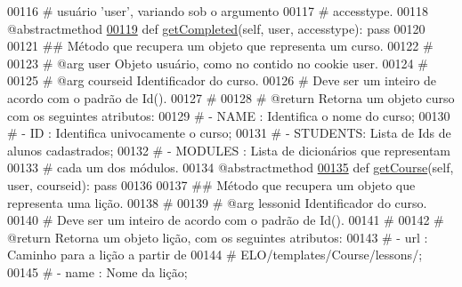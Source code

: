 \begin{DoxyCode}
00116     \textcolor{comment}{#                       usuário 'user', variando sob o argumento}
00117     \textcolor{comment}{#                       accesstype.}
00118     @abstractmethod
\hypertarget{CourseUnit_8py_source_l00119}{}\hyperlink{classCourse_1_1CourseUnit_1_1IfBusCourse_af764ac539a72d830490a80e4d70f567a}{00119}     \textcolor{keyword}{def }\hyperlink{classCourse_1_1CourseUnit_1_1IfBusCourse_af764ac539a72d830490a80e4d70f567a}{getCompleted}(self, user, accesstype): \textcolor{keyword}{pass}
00120 
00121     \textcolor{comment}{## Método que recupera um objeto que representa um curso.}
00122     \textcolor{comment}{#}
00123     \textcolor{comment}{#   @arg user       Objeto usuário, como no contido no cookie user.}
00124     \textcolor{comment}{#}
00125     \textcolor{comment}{#   @arg courseid   Identificador do curso.}
00126     \textcolor{comment}{#                       Deve ser um inteiro de acordo com o padrão de Id().}
00127     \textcolor{comment}{#}
00128     \textcolor{comment}{#   @return         Retorna um objeto curso com os seguintes atributos:}
00129     \textcolor{comment}{#                       - NAME    : Identifica o nome do curso;}
00130     \textcolor{comment}{#                       - ID      : Identifica univocamente o curso;}
00131     \textcolor{comment}{#                       - STUDENTS: Lista de Ids de alunos cadastrados;}
00132     \textcolor{comment}{#                       - MODULES : Lista de dicionários que representam}
00133     \textcolor{comment}{#                                       cada um dos módulos.}
00134     @abstractmethod
\hypertarget{CourseUnit_8py_source_l00135}{}\hyperlink{classCourse_1_1CourseUnit_1_1IfBusCourse_a35ae9c09ba977c6f37f97e204ac137cd}{00135}     \textcolor{keyword}{def }\hyperlink{classCourse_1_1CourseUnit_1_1IfBusCourse_a35ae9c09ba977c6f37f97e204ac137cd}{getCourse}(self, user, courseid): \textcolor{keyword}{pass}
00136 
00137     \textcolor{comment}{## Método que recupera um objeto que representa uma lição.}
00138     \textcolor{comment}{#}
00139     \textcolor{comment}{#   @arg lessonid   Identificador do curso.}
00140     \textcolor{comment}{#                       Deve ser um inteiro de acordo com o padrão de Id().}
00141     \textcolor{comment}{#}
00142     \textcolor{comment}{#   @return         Retorna um objeto lição, com os seguintes atributos:}
00143     \textcolor{comment}{#                       - url       : Caminho para a lição a partir de}
00144     \textcolor{comment}{#                                     ELO/templates/Course/lessons/;}
00145     \textcolor{comment}{#                       - name      : Nome da lição;}

\end{DoxyCode}
